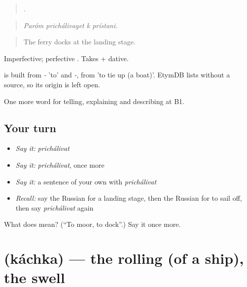 \begin{quote}
   .
\end{quote}

\begin{quote}
\emph{Paróm prichálivayet k prístani.}
\end{quote}

\begin{quote}
The ferry docks at the landing stage.
\end{quote}

Imperfective; perfective \emph{}. Takes \emph{} + dative.

\begin{cousinweb}
\emph{} is built from \emph{-} 'to' and \emph{-}, from \emph{} 'to tie up (a boat)'. EtymDB lists \emph{} without a source, so its origin is left open.
\end{cousinweb}

\begin{grammarlens}[title={What you've built}]
One more word for telling, explaining and describing at B1.
\end{grammarlens}

\subsection*{Your turn}
\begin{itemize}
\raggedright
  \item \emph{Say it:} \emph{prichálivat}
  \item \emph{Say it:} \emph{prichálivat}, once more
  \item \emph{Say it:} a sentence of your own with \emph{prichálivat}
  \item \emph{Recall:} say the Russian for a landing stage, then the Russian for to sail off, then say \emph{prichálivat} again
\end{itemize}

\begin{tcolorbox}[breakable,colback=teal!4,colframe=teal!35!black,title={Before you move on}]
What does  mean? (\textquotedblleft{}To moor, to dock\textquotedblright{}.) Say it once more.
\end{tcolorbox}
\section[\texorpdfstring{\ru{качка} (káchka)}{качка (káchka)}]{ (káchka) — the rolling (of a ship), the swell}


